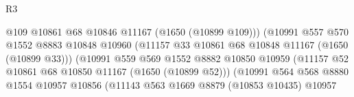 \begin{lexlean}{R3}
\begin{coremodule}
                                              @109
                                              @10861
                                              @68
                                              @10846
                                              @11167
                                              (@1650 (@10899 @109)))
                                            (@10991
                                              @557
                                              @570
                                              @1552
                                              @8883
                                              @10848
                                              @10960
                                              (@11157
                                                @33
                                                @10861
                                                @68
                                                @10848
                                                @11167
                                                (@1650 (@10899 @33)))
                                              (@10991
                                                @559
                                                @569
                                                @1552
                                                @8882
                                                @10850
                                                @10959
                                                (@11157
                                                  @52
                                                  @10861
                                                  @68
                                                  @10850
                                                  @11167
                                                  (@1650 (@10899 @52)))
                                                (@10991
                                                  @564
                                                  @568
                                                  @8880
                                                  @1554
                                                  @10957
                                                  @10856
                                                  (@11143
                                                    @563
                                                    @1669
                                                    @8879
                                                    (@10853 @10435)
                                                    @10957

\end{coremodule}
\end{lexlean}

